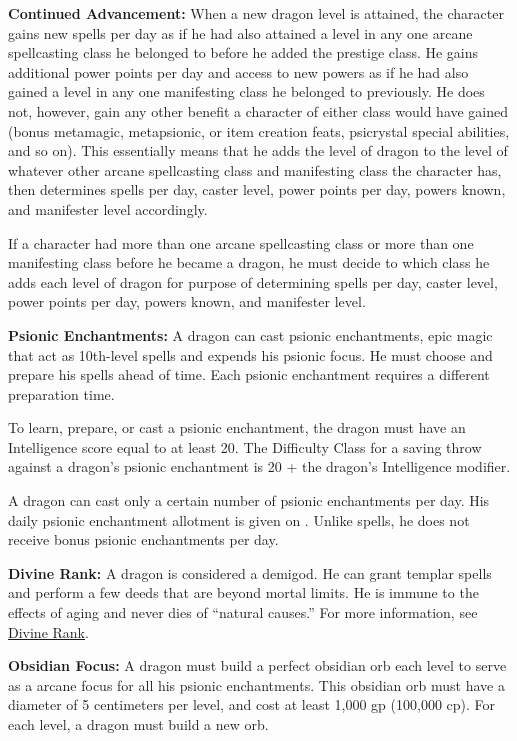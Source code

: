 {
\textbf{Continued Advancement:} When a new dragon level is attained, the character gains new spells per day as if he had also attained a level in any one arcane spellcasting class he belonged to before he added the prestige class. He gains additional power points per day and access to new powers as if he had also gained a level in any one manifesting class he belonged to previously. He does not, however, gain any other benefit a character of either class would have gained (bonus metamagic, metapsionic, or item creation feats, psicrystal special abilities, and so on). This essentially means that he adds the level of dragon to the level of whatever other arcane spellcasting class and manifesting class the character has, then determines spells per day, caster level, power points per day, powers known, and manifester level accordingly.

If a character had more than one arcane spellcasting class or more than one manifesting class before he became a dragon, he must decide to which class he adds each level of dragon for purpose of determining spells per day, caster level, power points per day, powers known, and manifester level.

\textbf{Psionic Enchantments:} A dragon can cast psionic enchantments, epic magic that act as 10th-level spells and expends his psionic focus. He must choose and prepare his spells ahead of time. Each psionic enchantment requires a different preparation time.

To learn, prepare, or cast a psionic enchantment, the dragon must have an Intelligence score equal to at least 20. The Difficulty Class for a saving throw against a dragon's psionic enchantment is 20 + the dragon's Intelligence modifier.

A dragon can cast only a certain number of psionic enchantments per day. His daily psionic enchantment allotment is given on . Unlike spells, he does not receive bonus psionic enchantments per day.

\textbf{Divine Rank:} A dragon is considered a demigod. He can grant templar spells and perform a few deeds that are beyond mortal limits. He is immune to the effects of aging and never dies of ``natural causes.'' For more information, see \hyperref[Divine Rank]{Divine Rank}.

\textbf{Obsidian Focus:} A dragon must build a perfect obsidian orb each level to serve as a arcane focus for all his psionic enchantments. This obsidian orb must have a diameter of 5 centimeters per level, and cost at least 1,000 gp (100,000 cp). For each level, a dragon must build a new orb.

}

